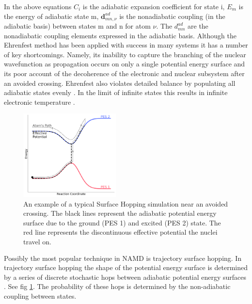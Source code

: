 In the above equations $C_{i}$ is the adiabatic expansion coefficient for state i, $E_{m}$ is the energy of adiabatic state m, $\mathbf{d}_{mn, \nu}^{ad}$ is the nonadiabatic coupling (in the adiabatic basis) between states m and n for atom $\nu$. The $d_{mn}^{ad}$ are the nonadiabatic coupling elements expressed in the adiabatic basis.
Although the Ehrenfest method has been applied with success in many systems \cite{Li2005Aug, Saita2012Dec, Kohen1998Sep} it has a number of key shortcomings. Namely, its inability to capture the branching of the nuclear wavefunction as propagation occurs on only a single potential energy surface and its poor account of the decoherence of the electronic and nuclear subsystem after an avoided crossing. Ehrenfest also violates detailed balance by populating all adiabatic states evenly \cite{tully_perspective:_2012, john_c._tully_nonadiabatic_nodate}. In the limit of infinite states this results in infinite electronic temperature \cite{parandekar_detailed_2006}.
\begin{figure}
  \includegraphics[width=0.45\textwidth]{./img/SH_hop.png}
  \caption{\label{fig:SH_diag}An example of a typical Surface Hopping simulation near an avoided crossing. The black lines represent the adiabatic potential energy surface due to the ground (PES 1) and excited (PES 2) state. The red line represents the discontinuous effective potential the nuclei travel on.}
\end{figure}
\noindent Possibly the most popular technique in NAMD is trajectory surface hopping. In trajectory surface hopping the shape of the potential energy surface is determined by a series of discrete stochastic hops between adiabatic potential energy surfaces \cite{tully_perspective:_2012}. See fig \ref{fig:SH_diag}.  The probability of these hops is determined by the non-adiabatic coupling between states.
